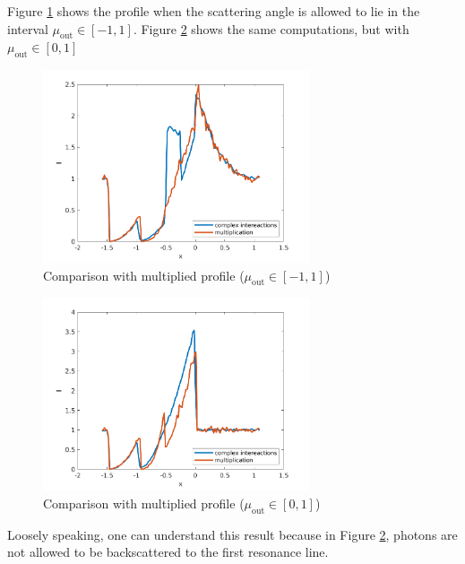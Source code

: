 \documentclass[../main/main.tex]{subfiles}
\begin{document}
Figure \ref{profile_vs_multiplication_xmueout_iso} shows the profile when the scattering angle is allowed to lie in the interval $\mu_{\text{out}} \in [-1,1]$. Figure \ref{profile_vs_multiplication_xmueout_pos} shows the same computations, but with $\mu_{\text{out}} \in [0, 1]$

\begin{figure}[!htp]
\centering
\includegraphics[width=0.7\textwidth]{../../two_resonance_lines/figures/multiplication_vs_complex_interactions_xmueout_iso.png}
\caption{Comparison with multiplied profile ($\mu_{\text{out}} \in [-1, 1]$)}
\label{profile_vs_multiplication_xmueout_iso}
\end{figure}

\begin{figure}[!htp]
\centering
\includegraphics[width=0.7\textwidth]{../../two_resonance_lines/figures/multiplication_vs_complex_interactions_xmueout_pos.png}
\caption{Comparison with multiplied profile ($\mu_{\text{out}} \in [0,1]$)}
\label{profile_vs_multiplication_xmueout_pos}
\end{figure}

Loosely speaking, one can understand this result because in Figure \ref{profile_vs_multiplication_xmueout_pos}, photons are not allowed to be backscattered to the first resonance line.
\end{document}
